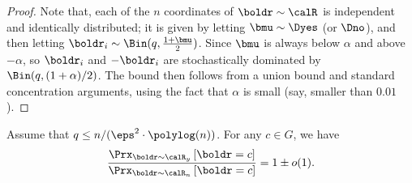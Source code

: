 \begin{proof}
    Note that, each of the $n$ coordinates of $\boldr \sim \calR$ is independent and identically distributed; it is given by letting $\bmu \sim \Dyes$ (or $\Dno$), and then letting $\boldr_i \sim \Bin(q, \frac{1 + \bmu}{2})$. Since $\bmu$ is always below $\alpha$ and above $-\alpha$, so $\boldr_i$ and $-\boldr_i$ are stochastically dominated by $\Bin(q, (1+\alpha)/2)$. The bound then follows from a union bound and standard concentration arguments, using the fact that $\alpha$ is small (say, smaller than $0.01$).
\end{proof}


\begin{lemma}\label{lemma:haha}
Assume that $q \leq n / (\eps^2 \cdot \polylog(n))$.
For any $c \in G$, we have
\begin{align*}
    \dfrac{\Prx_{\boldr \sim \calR_y}\left[ \boldr = c \right]}{\Prx_{\boldr \sim \calR_n}\left[ \boldr = c \right]} = 1 \pm o(1).
\end{align*}
\end{lemma}

